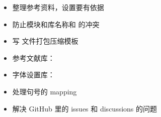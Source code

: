 \begin{itemize}[midpenalty=-1000,
  label=\protect\raisebox{-.3ex}{\NotDone}]
\begin{enumerate}
\begin{itemize}[midpenalty=-1000,
          label=\protect\raisebox{-.3ex}{\NotDone}]
          \item {}: 本科。参考最新的 2024 的本科模板。
          \item {}: 硕士
          \item {}: 博士
          \item {}: 数学与统计学院，兼容黄正华老师的模板配置。参考
            \begin{itemize}
              \item {}
              \item 黄正华老师的模板
            \end{itemize}
            子库：
            \begin{itemize}
              \item {}
              \item {}
              \item {}
            \end{itemize}
          \item {}: 计算机学院。参考 \href{https://github.com/cylqqqcyl/whu-thesis-2024}{cylqqqcyl 针对计算机学院改的模板}
          \item {}: 国家网络安全学院。参考网安用户上传的模板
        \end{itemize}
    \end{enumerate}
  \item 整理参考资料，设置要有依据
  \item[\Done] 防止模块和库名称和 \CusTeX 的冲突
  \item 写  文件打包压缩模板
  \item 参考文献库：
  \item 字体设置库：
  \item 处理句号的 mapping
  \item 解决  GitHub 里的 issues 和 discussions 的问题
\end{itemize}